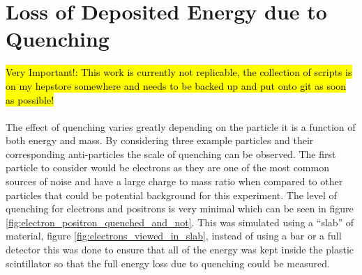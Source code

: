 \section{Loss of Deposited Energy due to Quenching}\label{sec:geant4Simulation_quenchingLoss}
\hl{Very Important!: This work is currently not replicable, the collection of scripts is on my hepstore somewhere and needs to be backed up and put onto git as soon as possible!}
\\\\The effect of quenching varies greatly depending on the particle it is a function of both energy and mass. By considering three example particles and their corresponding anti-particles the scale of quenching can be observed. The first particle to consider would be electrons as they are one of the most common sources of noise and have a large charge to mass ratio when compared to other particles that could be potential background for this experiment. The level of quenching for electrons and positrons is very minimal which can be seen in figure \ref{fig:electron_positron_quenched_and_not}. This was simulated using a ``slab'' of material, figure \ref{fig:electrons_viewed_in_slab}, instead of using a bar or a full detector this was done to ensure that all of the energy was kept inside the plastic scintillator so that the full energy loss due to quenching could be measured. 

